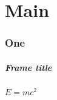 \documentclass{taltechslides}
\begin{document}
\maketitle

\part{Main}

\section{One}

\begin{frame}[fragile]
    \frametitle{Frame title}

    \(E=mc^2\)

\end{frame}
\end{document}
